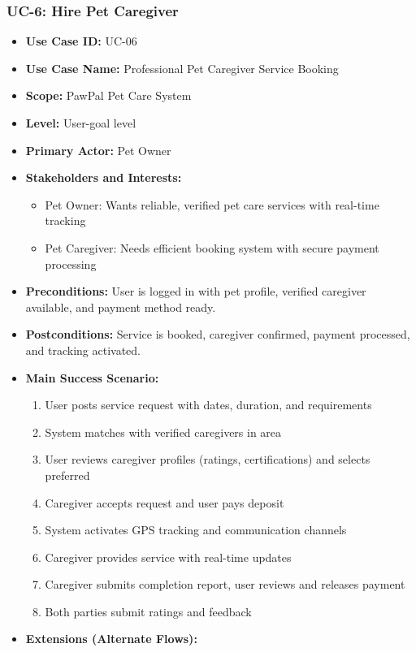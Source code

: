 \subsubsection*{UC-6: Hire Pet Caregiver}
\begin{itemize}
    \item \textbf{Use Case ID:} UC-06
    \item \textbf{Use Case Name:} Professional Pet Caregiver Service Booking
    \item \textbf{Scope:} PawPal Pet Care System
    \item \textbf{Level:} User-goal level
    \item \textbf{Primary Actor:} Pet Owner
    \item \textbf{Stakeholders and Interests:}
    \begin{itemize}
        \item Pet Owner: Wants reliable, verified pet care services with real-time tracking
        \item Pet Caregiver: Needs efficient booking system with secure payment processing
    \end{itemize}
    \item \textbf{Preconditions:} User is logged in with pet profile, verified caregiver available, and payment method ready.
    \item \textbf{Postconditions:} Service is booked, caregiver confirmed, payment processed, and tracking activated.
    \item \textbf{Main Success Scenario:}
    \begin{enumerate}
        \item User posts service request with dates, duration, and requirements
        \item System matches with verified caregivers in area
        \item User reviews caregiver profiles (ratings, certifications) and selects preferred
        \item Caregiver accepts request and user pays deposit
        \item System activates GPS tracking and communication channels
        \item Caregiver provides service with real-time updates
        \item Caregiver submits completion report, user reviews and releases payment
        \item Both parties submit ratings and feedback
    \end{enumerate}
    \item \textbf{Extensions (Alternate Flows):}

\end{itemize}
